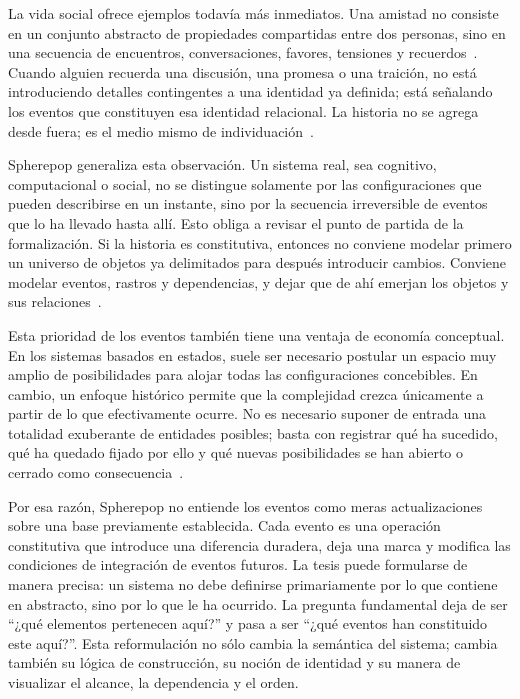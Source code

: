 \documentclass[12pt]{article}
\theoremstyle{plain}
\theoremstyle{definition}
\begin{document}
La vida social ofrece ejemplos todavía más inmediatos. Una amistad no consiste en un conjunto abstracto de propiedades compartidas entre dos personas, sino en una secuencia de encuentros, conversaciones, favores, tensiones y recuerdos~\cite{goffman}. Cuando alguien recuerda una discusión, una promesa o una traición, no está introduciendo detalles contingentes a una identidad ya definida; está señalando los eventos que constituyen esa identidad relacional. La historia no se agrega desde fuera; es el medio mismo de individuación~\cite{kim,fine}.

Spherepop generaliza esta observación. Un sistema real, sea cognitivo, computacional o social, no se distingue solamente por las configuraciones que pueden describirse en un instante, sino por la secuencia irreversible de eventos que lo ha llevado hasta allí. Esto obliga a revisar el punto de partida de la formalización. Si la historia es constitutiva, entonces no conviene modelar primero un universo de objetos ya delimitados para después introducir cambios. Conviene modelar eventos, rastros y dependencias, y dejar que de ahí emerjan los objetos y sus relaciones~\cite{winskel,pratt}.

Esta prioridad de los eventos también tiene una ventaja de economía conceptual. En los sistemas basados en estados, suele ser necesario postular un espacio muy amplio de posibilidades para alojar todas las configuraciones concebibles. En cambio, un enfoque histórico permite que la complejidad crezca únicamente a partir de lo que efectivamente ocurre. No es necesario suponer de entrada una totalidad exuberante de entidades posibles; basta con registrar qué ha sucedido, qué ha quedado fijado por ello y qué nuevas posibilidades se han abierto o cerrado como consecuencia~\cite{fowler,eventcollaborator}.

Por esa razón, Spherepop no entiende los eventos como meras actualizaciones sobre una base previamente establecida. Cada evento es una operación constitutiva que introduce una diferencia duradera, deja una marca y modifica las condiciones de integración de eventos futuros. La tesis puede formularse de manera precisa: un sistema no debe definirse primariamente por lo que contiene en abstracto, sino por lo que le ha ocurrido. La pregunta fundamental deja de ser ``¿qué elementos pertenecen aquí?'' y pasa a ser ``¿qué eventos han constituido este aquí?''. Esta reformulación no sólo cambia la semántica del sistema; cambia también su lógica de construcción, su noción de identidad y su manera de visualizar el alcance, la dependencia y el orden.
\end{document}
